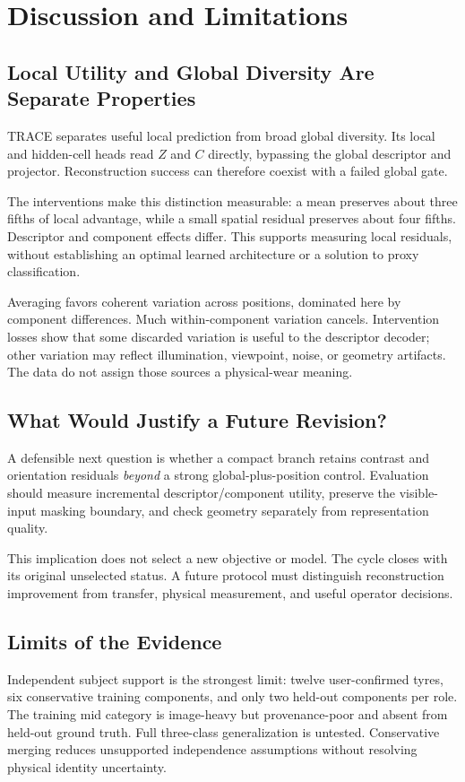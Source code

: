 \section{Discussion and Limitations}\label{sec:discussion}
\subsection{Local Utility and Global Diversity Are Separate Properties}
TRACE separates useful local prediction from broad global diversity. Its local and hidden-cell heads read $Z$ and $C$ directly, bypassing the global descriptor and projector. Reconstruction success can therefore coexist with a failed global gate.\AIdraftingnote

The interventions make this distinction measurable: a mean preserves about three fifths of local advantage, while a small spatial residual preserves about four fifths. Descriptor and component effects differ. This supports measuring local residuals, without establishing an optimal learned architecture or a solution to proxy classification.

Averaging favors coherent variation across positions, dominated here by component differences. Much within-component variation cancels. Intervention losses show that some discarded variation is useful to the descriptor decoder; other variation may reflect illumination, viewpoint, noise, or geometry artifacts. The data do not assign those sources a physical-wear meaning.

\subsection{What Would Justify a Future Revision?}
A defensible next question is whether a compact branch retains contrast and orientation residuals \emph{beyond} a strong global-plus-position control. Evaluation should measure incremental descriptor/component utility, preserve the visible-input masking boundary, and check geometry separately from representation quality.

This implication does not select a new objective or model. The cycle closes with its original unselected status. A future protocol must distinguish reconstruction improvement from transfer, physical measurement, and useful operator decisions.

\subsection{Limits of the Evidence}
Independent subject support is the strongest limit: twelve user-confirmed tyres, six conservative training components, and only two held-out components per role. The training mid category is image-heavy but provenance-poor and absent from held-out ground truth. Full three-class generalization is untested. Conservative merging reduces unsupported independence assumptions without resolving physical identity uncertainty.


